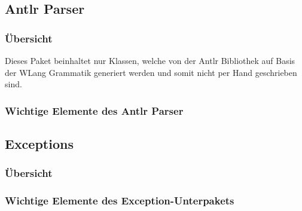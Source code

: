 \documentclass[parskip=full]{scrartcl}
\begin{document}
\subsection{Antlr Parser}
\subsubsection{Übersicht}
Dieses Paket beinhaltet nur Klassen, welche von der Antlr Bibliothek auf Basis der WLang Grammatik generiert werden und somit nicht per Hand geschrieben sind.
\subsubsection{Wichtige Elemente des Antlr Parser}

\subsection{Exceptions}
\subsubsection{Übersicht}
\subsubsection{Wichtige Elemente des Exception-Unterpakets}
\end{document}
